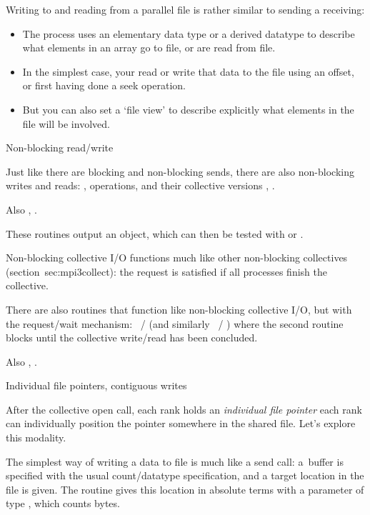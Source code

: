 Writing to and reading from a parallel file is rather similar to
sending a receiving:
\begin{itemize}
\item The process uses an elementary data type or a derived datatype
  to describe what elements in an array go to file, or are read from
  file.
\item In the simplest case, your read or write that data to the file using an
  offset, or first having done a seek operation.
\item But you can also set a `file view' to describe explicitly what
  elements in the file will be involved.
\end{itemize}

 {Non-blocking read/write}

Just like there are blocking and non-blocking sends, there are also
non-blocking writes and reads:
,
operations,
and their collective versions
,
.

Also 
,
.

These routines output an  object,
which can then be tested with
 or .

Non-blocking collective I/O functions
much like other non-blocking collectives
(section~{sec:mpi3collect}):
the request is satisfied if all processes finish the collective.

There are also  routines
that function like non-blocking collective I/O, but with the request/wait mechanism:
~/
(and similarly
~/
)
where the second routine blocks until the collective write/read
has been concluded.

Also , .

 {Individual file pointers, contiguous writes}
\label{sec:mpi-filepoint}

After the collective open call, each rank holds an
\emph{individual file pointer}
each rank can individually position the pointer somewhere in the shared file.
Let's explore this modality.

The simplest way of writing a data to file is much like a send call:
a~buffer is specified with the usual count/datatype specification,
and a target location in the file is given.
The routine  gives this location
in absolute terms with a parameter of type ,
which counts bytes.

